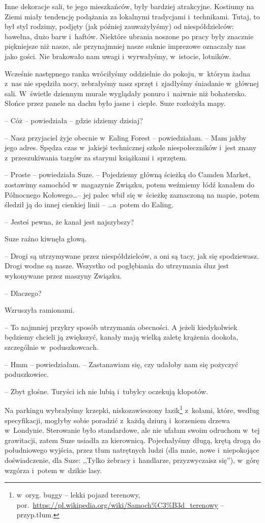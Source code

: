 \documentclass[oneside,polish,11pt,sfheadings]{mwbk}
\begin{document}
Inne dekoracje sali, te jego mieszkańców, były bardziej atrakcyjne.
Kostiumy na Ziemi miały tendencję podążania za lokalnymi tradycjami i~technikami. Tutaj, to był styl rodzimy, podjęty (jak później
zauważyłyśmy) od niespółdzielców: bawełna, dużo barw i~haftów. Niektóre
ubrania noszone po pracy były znacznie piękniejsze niż nasze, ale
przynajmniej nasze suknie imprezowe oznaczały nas jako gości. Nie
brakowało nam uwagi i~wyrwałyśmy, w~istocie, lotników.

Wcześnie następnego ranka wróciłyśmy oddzielnie do pokoju, w~którym
żadna z~nas nie spędziła nocy, zebrałyśmy nasz sprzęt i~zjadłyśmy
śniadanie w~głównej sali. W~świetle dziennym murale wyglądały ponuro i~naiwnie niż bohatersko. Słońce przez panele na dachu było jasne i~ciepłe. Suze rozłożyła mapy.

-- Cóż -- powiedziała -- gdzie idziemy dzisiaj?

-- Nasz przyjaciel żyje obecnie w~Ealing Forest -- powiedziałam. -- Mam
jakby jego adres. Spędza czas w~jakiejś technicznej szkole
niespołeczników i~jest znany z~przeszukiwania targów za starymi
książkami i~sprzętem.

-- Proste -- powiedziała Suze. -- Pojedziemy główną ścieżką do Camden
Market, zostawimy samochód w~magazynie Związku, potem weźmiemy łódź
kanałem do Północnego Kołowego\ldots  -- jej palec wbił się w~ścieżkę
zaznaczoną na mapie, potem śledził ją do innej cienkiej linii -- \ldots  a~potem do Ealing.

-- Jesteś pewna, że kanał jest najszybszy?

Suze raźno kiwnęła głową. 

-- Drogi są utrzymywane przez niespółdzielców,
a oni są tacy, jak się spodziewasz. Drogi wodne są nasze. Wszystko od
pogłębiania do utrzymania śluz jest wykonywane przez maszyny Związku.

-- Dlaczego?

Wzruszyła ramionami. 

-- To najmniej przykry sposób utrzymania obecności.
A jeżeli kiedykolwiek będziemy chcieli ją zwiększyć, kanały mają wielką
zaletę krążenia dookoła, szczególnie w~poduszkowcach.

-- Hmm -- powiedziałam. -- Zastanawiam się, czy udałoby nam się pożyczyć
poduszkowiec.

-- Zbyt głośne. Turyści ich nie lubią i~tubylcy oczekują kłopotów.

Na parkingu wybrałyśmy krzepki, niskozawieszony łazik\footnote{ w~oryg. buggy
-- lekki pojazd terenowy,
por.~\url{https://pl.wikipedia.org/wiki/Samoch\%C3\%B3d\_terenowy}
-- przyp.tłum.} z~kołami, które, według specyfikacji, mogłyby sobie
poradzić z~każdą dziurą i~korzeniem drzewa w~Londynie. Sterowanie było
standardowe, ale nie ufałam swoim odruchom w~tej grawitacji, zatem Suze
usiadła za kierownicą. Pojechałyśmy długą, krętą drogą do południowego
wyjścia, przez tłum natrętnych ludzi (dla mnie, nowe i~niepokojące
doświadczenie, dla Suze: ,,Tylko żebracy i~handlarze, przyzwyczaisz
się''), w~górę wzgórza i~potem w~dzikie lasy.
\end{document}
